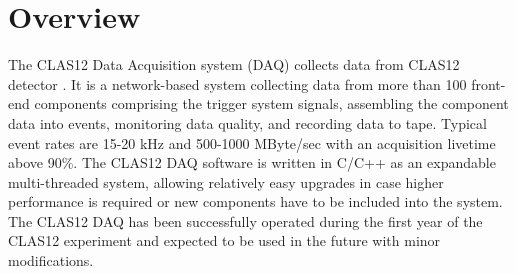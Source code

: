 \section{Overview}

The CLAS12 Data Acquisition system (DAQ) collects data from CLAS12 detector \cite{overview-ref}. It is a network-based system collecting data from more than 100 front-end components comprising the trigger system signals, assembling the component data into events, monitoring data quality, and recording data to tape. Typical event rates are 15-20 kHz and 500-1000 MByte/sec with an acquisition livetime above 90\%. The CLAS12 DAQ software is written in C/C++ as an expandable multi-threaded system, allowing relatively easy upgrades in case higher performance is required or new components have to be included into the system. The CLAS12 DAQ has been successfully operated during the first year of the CLAS12 experiment and expected to be used in the future with minor modifications.


